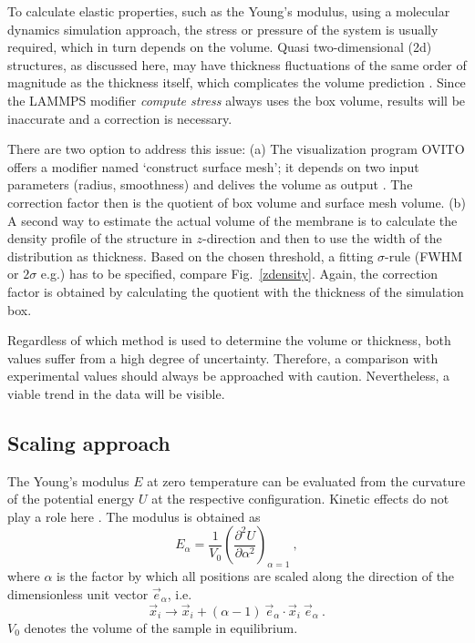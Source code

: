 \documentclass[preprint,12pt]{elsarticle}
\newcommand{\figref}[1]{Fig.~\protect\ref{#1}}
\begin{document}
To calculate elastic properties, such as the Young's modulus, 
using a molecular dynamics simulation approach, the stress or pressure 
of the system is usually required, which in turn depends on the volume. 
Quasi two-dimensional (2d) structures, as discussed here, 
may have thickness fluctuations of the same order of magnitude as the thickness itself, 
which complicates the volume prediction \cite{EGV:PRB21,Mihlan:B21}.
Since the LAMMPS modifier \textit{compute stress} always uses the box volume, 
results will be inaccurate and a correction is necessary.

There are two option to address this issue: (a) The visualization program OVITO 
offers a modifier named `construct surface mesh'; it depends on two input parameters 
(radius, smoothness) and delives the volume as output \cite{Ovito:UM}. 
The correction factor then is the quotient of box volume and surface mesh volume.
(b) A second way to estimate the actual volume of the membrane
is to calculate the density profile of the structure in $z$-direction 
and then to use the width of the distribution as thickness. Based on the chosen threshold, 
a fitting $\sigma$-rule (FWHM or $2\sigma$ e.g.) has to be specified, compare \figref{zdensity}.
Again, the correction factor 
is obtained by calculating the quotient with the thickness of the simulation box. 

Regardless of which method is used to determine the volume or thickness, 
both values suffer from a high degree of uncertainty. 
Therefore, a comparison with experimental values should always be approached with caution. 
Nevertheless, a viable trend in the data will be visible.


\subsection{Scaling approach}
\label{sec-2-2}

The Young's modulus $E$ at zero temperature can be evaluated from the curvature 
of the potential energy $U$ at the respective configuration. 
Kinetic effects do not play a role here \cite{HGB:PRL98,ITO:JPCS14}. 
The modulus is obtained as
\begin{equation}
\label{E-2-2}
E_\alpha = \frac{1}{V_0} \left(\frac{\partial^2 U}{\partial \alpha^2}\right)_{\alpha=1}
\ ,
\end{equation}
where $\alpha$ is the factor by which all
positions are scaled along the direction of the dimensionless
unit vector $\vec{e}_{\alpha}$, 
i.e.\
\begin{equation}
\label{E-2-2b}
\vec{x}_i \rightarrow \vec{x}_i + (\alpha - 1) \
\vec{e}_{\alpha}\cdot\vec{x}_i \ \vec{e}_{\alpha}
\ .
\end{equation}
$V_0$ denotes the volume of the sample in equilibrium. 
\end{document}
